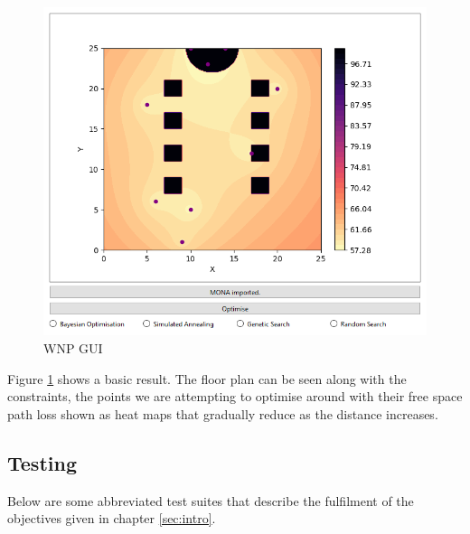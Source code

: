 		\begin{figure}[H]
		\centering
		\includegraphics[scale=0.75]{graphics/gui}
		\caption{WNP GUI}
		\label{fig:gui}
		\end{figure}

		Figure \ref{fig:gui} shows a basic result. The floor plan can be seen along with the constraints, the points we are attempting to optimise around with their free space path loss shown as heat maps that gradually reduce as the distance increases.
		
	\subsection{Testing}
		\label{sec:software_testing}
		Below are some abbreviated test suites that describe the fulfilment of the objectives given in chapter \ref{sec:intro}.
